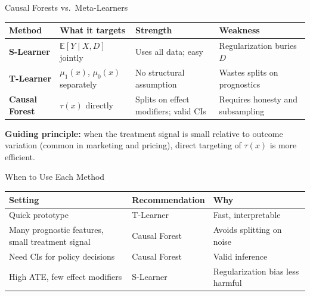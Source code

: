 \documentclass[aspectratio=169, 11pt, handout]{beamer}
\newcommand{\E}{\mathbb{E}}
\begin{document}
\begin{frame}{Causal Forests vs.\ Meta-Learners}
 
\begin{center}
\small
\begin{tabular}{p{2.1cm}p{3.4cm}p{3.4cm}p{3.8cm}}
\toprule
\textbf{Method} & \textbf{What it targets} & \textbf{Strength} & \textbf{Weakness} \\
\midrule
\textbf{S-Learner} & $\E[Y \mid X, D]$ jointly & Uses all data; easy & Regularization buries $D$ \\[0.1em]
\textbf{T-Learner} & $\mu_1(x)$, $\mu_0(x)$ separately & No structural assumption & Wastes splits on prognostics \\[0.1em]
\textbf{Causal Forest} & $\tau(x)$ directly & Splits on effect modifiers; valid CIs & Requires honesty and subsampling \\
\bottomrule
\end{tabular}
\end{center}
 
\pause
\bigskip
 
\textbf{Guiding principle:} when the treatment signal is small relative to outcome variation (common in marketing and pricing), direct targeting of $\tau(x)$ is more efficient.
 
\end{frame}
 
\begin{frame}{When to Use Each Method}
 
\begin{center}
\begin{tabular}{p{5.5cm}p{3.0cm}p{4.0cm}}
\toprule
\textbf{Setting} & \textbf{Recommendation} & \textbf{Why} \\
\midrule
Quick prototype & T-Learner & Fast, interpretable \\[0.5em]
Many prognostic features, small treatment signal & Causal Forest & Avoids splitting on noise \\[0.5em]
Need CIs for policy decisions & Causal Forest & Valid inference \\[0.5em]
High ATE, few effect modifiers & S-Learner & Regularization bias less harmful \\
\bottomrule
\end{tabular}
\end{center}
 
\end{frame}
 
\end{document}
